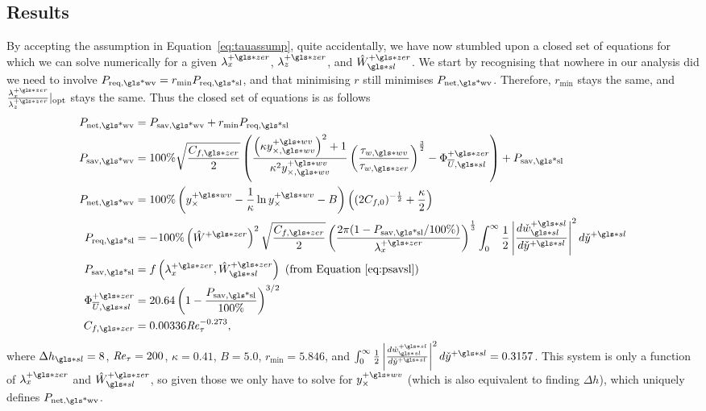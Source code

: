 \subsection{Results}
By accepting the assumption in Equation~\eqref{eq:tauassump}, quite accidentally, we have now stumbled upon a closed set of equations for which we can solve numerically for a given  $\lambda_x\pz$, $\lambda_z\pz$, and $\hat{W}\ssl\pz$. We start by recognising that nowhere in our analysis did we need to involve $P_\text{req,\gls*{wv}}=r_\text{min} P_\text{req,\gls*{sl}}  $, and that minimising $r$ still minimises  $P_\text{net,\gls*{wv}} $. Therefore, $r_\text{min} $ stays the same, and $\frac{\lambda_x\pz}{\lambda_z\pz}\rvert_\text{opt} $ stays the same. Thus the closed set of equations is as follows
\begin{align}
	P_\text{net,\gls*{wv}} &= P_\text{sav,\gls*{wv}} + r_\text{min} P_\text{req,\gls*{sl}} \label{eq:Pnetww}\\  
	P_\text{sav,\gls*{wv}} &=  100\% \sqrt{\frac{C_{f,\gls*{zer}}}{2}}\left(  \frac{\left(  \kappa y_{\times,\gls*{wv}}\pw  \right) ^2+ 1}{\kappa^2 y_{\times,\gls*{wv}}\pw} \left( \frac{\tau_{w,\gls*{wv}}}{\tau_{w,\gls*{zer}}} \right) ^{\frac{3}{2}}-\Phi _{\overline{U},\gls*{sl}}\pz\right) +P_\text{sav,\gls*{sl}} \label{eq:Psavww}\\
	P_\text{net,\gls*{wv}} &=100\%\left(  y_{\times}\pw - \frac{1}{\kappa}\ln y_{\times}\pw- B \right) \left( (2C_{f,0})^{-\frac{1}{2}} +\frac{\kappa}{2} \right) \label{eq:ycross}\\
	P_\text{req,\gls*{sl}} &= -100\%\left( \hat{W}\pz  \right) ^2\sqrt{\frac{C_{f,\gls*{zer}}}{2}}   \left( \frac{2\pi (1-P_\text{sav,\gls*{sl}} / 100\%) }{\lambda_x\pz}\right) ^{\frac{1}{3}}\int_{0}^{\infty} \frac{1}{2} \left| \frac{d\check{w}\ps\ssl}{d\check{y}\ps} \right| ^2 d\check{y}\ps \\ 
		P_\text{sav,\gls*{sl}} &= f\left(\lambda_x\pz, \hat{W}\ssl\pz\right) \text{ (from Equation~\eqref{eq:psavsl})}\\
		\Phi _{\overline{U},\gls*{sl}}\pz&=20.64\left( 1-\frac{P_\text{sav,\gls*{sl}} }{100\%}\right) ^{3 /2} \\
	C_{f,\gls*{zer}} &= 0.00336\Rey_{\tau}^{-0.273}
,\end{align}
where $\Delta h \ssl=8$, $\mbox{\textit{Re}}_{\tau} = 200$,  $\kappa=0.41$,  $B=5.0$,  $r_\text{min} =5.846$, and $\int_{0}^{\infty} \frac{1}{2} \left| \frac{d\check{w}\ps\ssl}{d\check{y}\ps} \right| ^2 d\check{y}\ps = 0.3157$. This system is only a function of $\lambda_x\pz$ and  $\hat{W}\ssl\pz$, so given those we only have to solve for $y_{\times}\pw$ (which is also equivalent to finding $\Delta h$), which uniquely defines $P_\text{net,\gls*{wv}} $.

